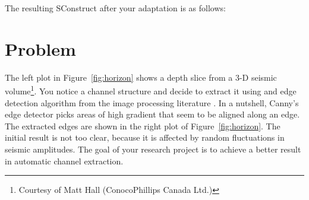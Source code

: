 The resulting SConstruct after your adaptation is  as follows:
\lstset{language=python,numbers=left,numberstyle=\tiny,showstringspaces=false}




\section{Problem}


The left plot in Figure~\ref{fig:horizon} shows a depth slice from a 3-D
seismic volume\footnote{Courtesy of Matt Hall (ConocoPhillips Canada
Ltd.)}. You notice a channel structure and decide to extract it using
and edge detection algorithm from the image processing literature
\cite[]{canny}. In a nutshell, Canny's edge detector picks areas of
high gradient that seem to be aligned along an edge. The extracted
edges are shown in the right plot of Figure~\ref{fig:horizon}. The initial
result is not too clear, because it is affected by random
fluctuations in seismic amplitudes. The goal of your research project
is to achieve a better result in automatic channel extraction.

